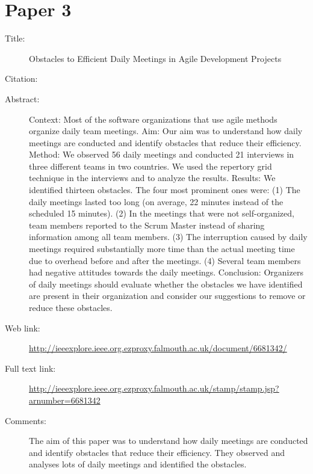 \documentclass{scrartcl}
\begin{document}
\section*{Paper 3}
\begin{description}
\item[Title:] Obstacles to Efficient Daily Meetings in Agile Development Projects
\item[Citation:] \cite{Obstacles}
\item[Abstract:] Context: Most of the software organizations that use agile methods organize daily team meetings. Aim: Our aim was to understand how daily meetings are conducted and identify obstacles that reduce their efficiency. Method: We observed 56 daily meetings and conducted 21 interviews in three different teams in two countries. We used the repertory grid technique in the interviews and to analyze the results. Results: We identified thirteen obstacles. The four most prominent ones were: (1) The daily meetings lasted too long (on average, 22 minutes instead of the scheduled 15 minutes). (2) In the meetings that were not self-organized, team members reported to the Scrum Master instead of sharing information among all team members. (3) The interruption caused by daily meetings required substantially more time than the actual meeting time due to overhead before and after the meetings. (4) Several team members had negative attitudes towards the daily meetings. Conclusion: Organizers of daily meetings should evaluate whether the obstacles we have identified are present in their organization and consider our suggestions to remove or reduce these obstacles.
\item[Web link:] \url{http://ieeexplore.ieee.org.ezproxy.falmouth.ac.uk/document/6681342/}
\item[Full text link:] \url{http://ieeexplore.ieee.org.ezproxy.falmouth.ac.uk/stamp/stamp.jsp?arnumber=6681342}
\item[Comments:] The aim of this paper was to understand how daily meetings are conducted and identify obstacles that reduce their efficiency. They observed and analyses lots of daily meetings and identified the obstacles. 
\end{description}
\end{document}
